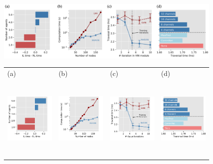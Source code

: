 \begin{figure}[t]
\centering
\iflatexml
\includegraphics[width=6\textwidth]{figs/figall.png}
\else
\begin{small}
\vspace{-0.1in}
\begin{tabular}{llll}
(a) & (b) & (c) & (d)\\
\includegraphics[height=4.1cm,trim={0.2cm 0 0.4cm 0},clip]{figs/diff_cost.pdf} &
\includegraphics[height=4.1cm,trim={0.2cm 0 0.8cm 0},clip]{figs/runtime.pdf} &
\includegraphics[height=4.1cm,trim={0.2cm 0 0.8cm 0},clip]{figs/iterations} &
\includegraphics[height=4.1cm,trim={0.0cm 0 0cm 0},clip]{figs/comms}\\

\end{tabular}
\end{small}
\end{figure}
